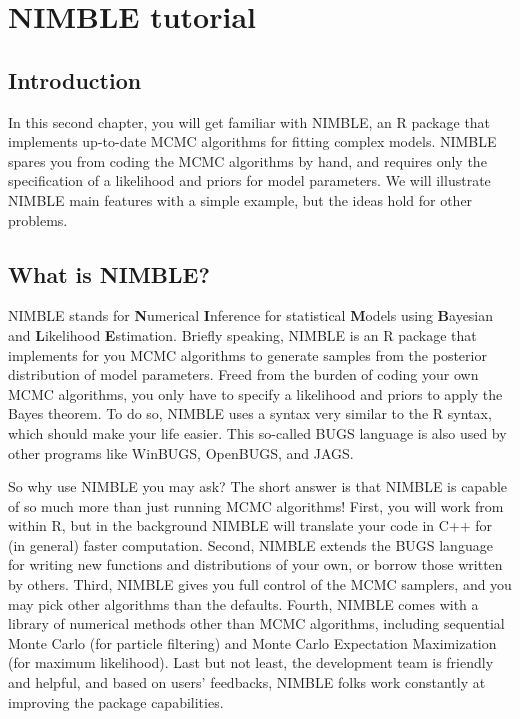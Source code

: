 \documentclass[
  12pt,
]{krantz}
\begin{document}
\hypertarget{intronimble}{%
\chapter{NIMBLE tutorial}\label{intronimble}}

\hypertarget{introduction-2}{%
\section{Introduction}\label{introduction-2}}

In this second chapter, you will get familiar with NIMBLE, an R package that implements up-to-date MCMC algorithms for fitting complex models. NIMBLE spares you from coding the MCMC algorithms by hand, and requires only the specification of a likelihood and priors for model parameters. We will illustrate NIMBLE main features with a simple example, but the ideas hold for other problems.

\hypertarget{what-is-nimble}{%
\section{What is NIMBLE?}\label{what-is-nimble}}

NIMBLE stands for \textbf{N}umerical \textbf{I}nference for statistical \textbf{M}odels using \textbf{B}ayesian and \textbf{L}ikelihood \textbf{E}stimation. Briefly speaking, NIMBLE is an R package that implements for you MCMC algorithms to generate samples from the posterior distribution of model parameters. Freed from the burden of coding your own MCMC algorithms, you only have to specify a likelihood and priors to apply the Bayes theorem. To do so, NIMBLE uses a syntax very similar to the R syntax, which should make your life easier. This so-called BUGS language is also used by other programs like WinBUGS, OpenBUGS, and JAGS.

So why use NIMBLE you may ask? The short answer is that NIMBLE is capable of so much more than just running MCMC algorithms! First, you will work from within R, but in the background NIMBLE will translate your code in C++ for (in general) faster computation. Second, NIMBLE extends the BUGS language for writing new functions and distributions of your own, or borrow those written by others. Third, NIMBLE gives you full control of the MCMC samplers, and you may pick other algorithms than the defaults. Fourth, NIMBLE comes with a library of numerical methods other than MCMC algorithms, including sequential Monte Carlo (for particle filtering) and Monte Carlo Expectation Maximization (for maximum likelihood). Last but not least, the development team is friendly and helpful, and based on users' feedbacks, NIMBLE folks work constantly at improving the package capabilities.
\end{document}
